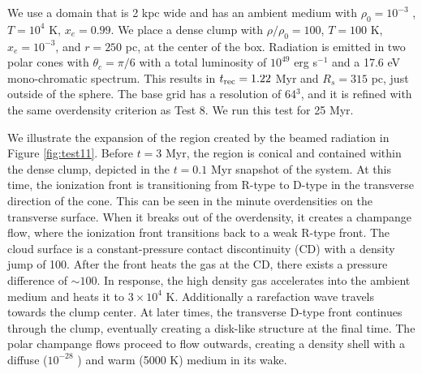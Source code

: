 \documentclass[12pt,preprint]{aastex}
\begin{document}
We use a domain that is 2 kpc wide and has an ambient medium with
$\rho_0 = 10^{-3}$ \cubecm, $T = 10^4$ K, $x_e = 0.99$.  We place a
dense clump with $\rho/\rho_0 = 100$, $T = 100$ K, $x_e = 10^{-3}$,
and $r = 250$ pc, at the center of the box.  Radiation is emitted in
two polar cones with $\theta_c = \pi/6$ with a total luminosity of
$10^{49}$ erg s$^{-1}$ and a 17.6 eV mono-chromatic spectrum.  This
results in $t_{\rm rec} = 1.22$ Myr and $R_s = 315$ pc, just outside
of the sphere.  The base grid has a resolution of 64$^3$, and it is
refined with the same overdensity criterion as Test 8.  We run this
test for 25 Myr.

We illustrate the expansion of the  region created by the
beamed radiation in Figure \ref{fig:test11}.  Before $t = 3$ Myr, the
 region is conical and contained within the dense clump,
depicted in the $t = 0.1$ Myr snapshot of the system.  At this time,
the ionization front is transitioning from R-type to D-type in the
transverse direction of the cone.  This can be seen in the minute
overdensities on the  transverse surface.  When it breaks
out of the overdensity, it creates a champange flow, where the
ionization front transitions back to a weak R-type front.  The cloud
surface is a constant-pressure contact discontinuity (CD) with a
density jump of 100.  After the front heats the gas at the CD, there
exists a pressure difference of $\sim 100$.  In response, the high
density gas accelerates into the ambient medium and heats it to $3
\times 10^4$ K.  Additionally a rarefaction wave travels towards the
clump center.  At later times, the transverse D-type front continues
through the clump, eventually creating a disk-like structure at the
final time.  The polar champange flows proceed to flow outwards,
creating a density shell with a diffuse ($10^{-28}$ \cubecm) and warm
(5000 K) medium in its wake.

% 
\end{document}
